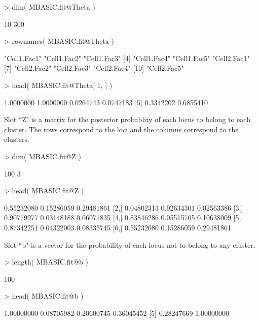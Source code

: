 \documentclass[a4paper,10pt]{article}
\begin{document}
\begin{Schunk}
\begin{Sinput}
> dim( MBASIC.fit@Theta )
\end{Sinput}
\begin{Soutput}
[1]  10 300
\end{Soutput}
\begin{Sinput}
> rownames( MBASIC.fit@Theta )
\end{Sinput}
\begin{Soutput}
 [1] "Cell1.Fac1" "Cell1.Fac2" "Cell1.Fac3"
 [4] "Cell1.Fac4" "Cell1.Fac5" "Cell2.Fac1"
 [7] "Cell2.Fac2" "Cell2.Fac3" "Cell2.Fac4"
[10] "Cell2.Fac5"
\end{Soutput}
\begin{Sinput}
> head( MBASIC.fit@Theta[ 1, ] )
\end{Sinput}
\begin{Soutput}
[1] 1.0000000 1.0000000 0.0264743 0.0747183
[5] 0.3342202 0.6855410
\end{Soutput}
\end{Schunk}

Slot ``Z" is a matrix for the posterior probablity of each locus to belong to each cluster. The rows correspond to the loci and the columns correspond to the clusters.

\begin{Schunk}
\begin{Sinput}
> dim( MBASIC.fit@Z )
\end{Sinput}
\begin{Soutput}
[1] 100   3
\end{Soutput}
\begin{Sinput}
> head( MBASIC.fit@Z )
\end{Sinput}
\begin{Soutput}
           [,1]       [,2]       [,3]
[1,] 0.55232080 0.15286059 0.29481861
[2,] 0.04802313 0.92634301 0.02563386
[3,] 0.90779977 0.03148188 0.06071835
[4,] 0.83846286 0.05515705 0.10638009
[5,] 0.87342251 0.04322003 0.08335745
[6,] 0.55232080 0.15286059 0.29481861
\end{Soutput}
\end{Schunk}

Slot ``b" is a vector for the probability of each locus not to belong to any cluster. 

\begin{Schunk}
\begin{Sinput}
> length( MBASIC.fit@b )
\end{Sinput}
\begin{Soutput}
[1] 100
\end{Soutput}
\begin{Sinput}
> head( MBASIC.fit@b )
\end{Sinput}
\begin{Soutput}
[1] 1.00000000 0.08705982 0.20600745 0.36045452
[5] 0.28247669 1.00000000
\end{Soutput}
\end{Schunk}
\end{document}
